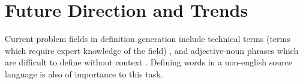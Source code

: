\section{Future Direction and Trends}
Current problem fields in definition generation include technical terms (terms
which require expert knowledge of the field) \cite{huang_cdm_2021}, and
adjective-noun phrases which are difficult to define without context
\cite{bevilacqua_generationary_2020}. Defining words in a non-english source
language is also of importance to this task.